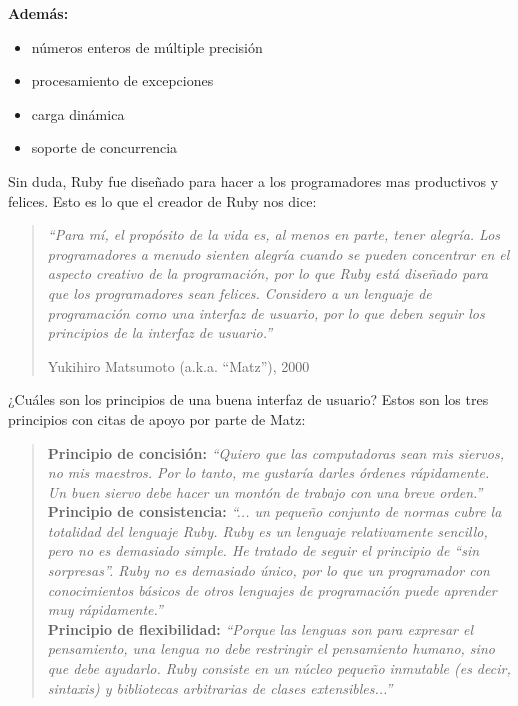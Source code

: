 \documentclass{article}
\begin{document}
\textbf{Además:}
\begin{itemize}
\itemsep=2pt \topsep=0pt \partopsep=0pt \parskip=0pt \parsep=0pt
	\item números enteros de múltiple precisión
	\item procesamiento de excepciones
	\item carga dinámica
	\item soporte de concurrencia
\end{itemize}
\bigskip\bigskip

Sin duda, Ruby fue diseñado para hacer a los programadores mas productivos y felices. Esto es lo que el creador de Ruby nos dice:

\begin{quotation}
\em``Para mí, el propósito de la vida es, al menos en parte, tener alegría. Los programadores a menudo sienten alegría cuando se pueden concentrar en el aspecto creativo de la programación, por lo que Ruby está diseñado para que los programadores sean felices. Considero a un lenguaje de programación como una interfaz de usuario, por lo que deben seguir los principios de la interfaz de usuario.''

\begin{flushright} Yukihiro Matsumoto (a.k.a. “Matz”), 2000 \end{flushright}
\end{quotation}
\bigskip

¿Cuáles son los principios de una buena interfaz de usuario? Estos son los tres principios con citas de apoyo por parte de Matz:\\

\begin{quotation}
\noindent \textbf{Principio de concisión:} \textit{``Quiero que las computadoras sean mis siervos, no mis maestros. Por lo tanto, me gustaría darles órdenes rápidamente. Un buen siervo debe hacer un montón de trabajo con una breve orden.''}\\

\noindent \textbf{Principio de consistencia:} \textit{``... un pequeño conjunto de normas cubre la totalidad del lenguaje Ruby. Ruby es un lenguaje relativamente sencillo, pero no es demasiado simple. He tratado de seguir el principio de ``sin sorpresas''. Ruby no es demasiado único, por lo que un programador con conocimientos básicos de otros lenguajes de programación puede aprender muy rápidamente.''}\\

\noindent \textbf{Principio de flexibilidad:} \textit{``Porque las lenguas son para expresar el pensamiento, una lengua no debe restringir el pensamiento humano, sino que debe ayudarlo. Ruby consiste en un núcleo pequeño inmutable (es decir, sintaxis) y bibliotecas arbitrarias de clases extensibles...''}
\end{quotation}
\bigskip
\end{document}
